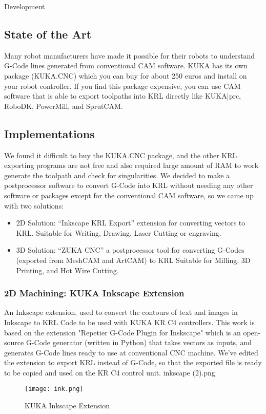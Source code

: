 \documentclass[a4paper]{book}
\begin{document}
\begin{chapter}{Development}
\subsection{State of the Art}
Many robot manufacturers have made it possible for their robots to understand G-Code lines generated from conventional CAM software. KUKA has its own package (KUKA.CNC) which you can buy for about 250 euros and install on your robot controller. If you find this package expensive, you can use CAM software that is able to export toolpaths into KRL directly like KUKA|prc, RoboDK, PowerMill, and  SprutCAM.
\vspace{.5cm}
\subsection{ Implementations }

We found it difficult to buy the KUKA.CNC package, and the other KRL exporting programs are not free and also required large amount of RAM to work generate the toolpath and check for singularities. We decided to make a postprocessor software to convert G-Code into KRL without needing any other software or packages except for the conventional CAM software, so we came up with two solutions:
\begin{itemize}
	\item 2D Solution: “Inkscape KRL Export” extension for converting vectors to KRL.
	\newline 
	\small Suitable for Writing, Drawing, Laser Cutting or engraving.
	\item \normalsize 3D Solution: “ZUKA CNC” a postprocessor tool for converting G-Codes (exported from MeshCAM and ArtCAM) to KRL
	\newline
	\small Suitable for Milling, 3D Printing, and Hot Wire Cutting. 
	
\end{itemize}
\subsubsection{2D Machining: KUKA Inkscape Extension}

An Inkscape extension, used to convert the contours of text and images in Inkscape to KRL Code to be used with KUKA KR C4 controllers. This work is based on the extension "Repetier G-Code Plugin for Inskscape" which is an open-source G-Code generator (written in Python) that takes vectors as inputs, and generates G-Code lines ready to use at conventional CNC machine. We’ve edited the extension to export KRL instead of G-Code, so that the exported file is ready to be copied and used on the KR C4 control unit.
inkscape (2).png
\begin{figure}[H]
	\centering
	\caption{KUKA Inkscape Extension}
	\texttt{[image: ink.png]}
\end{figure}


\end{chapter}
\end{document}

